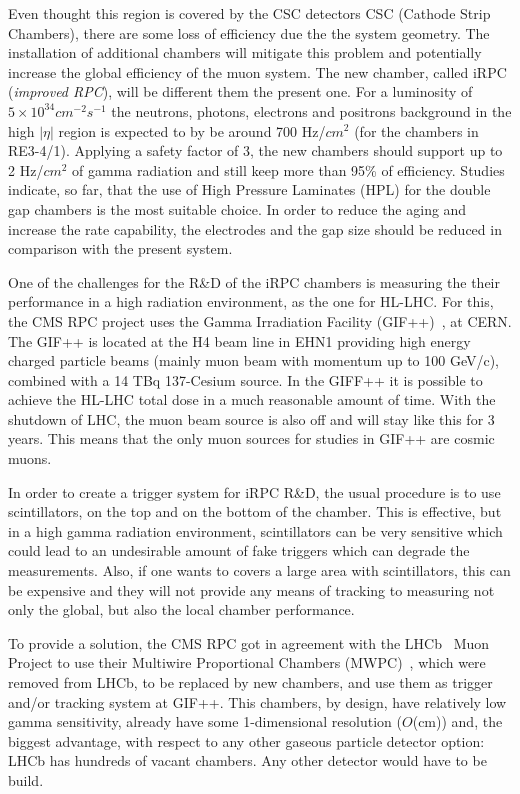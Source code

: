 Even thought this region is covered by the CSC detectors CSC (Cathode Strip Chambers), there are some loss of efficiency due the the system geometry. The installation of additional chambers will mitigate this problem and potentially increase the global efficiency of the muon system. The new chamber, called iRPC (\textit{improved RPC}), will be different them the present one. For a luminosity of $5 \times 10^{34} cm^{-2} s^{-1}$  the neutrons, photons, electrons and positrons background in the high $|\eta|$ region is expected to by be around 700 Hz/$cm^{2}$ (for the chambers in RE3-4/1). Applying a safety factor of 3, the new chambers should support up to 2 Hz/$cm^{2}$ of gamma radiation and still keep more than 95\% of efficiency. Studies indicate, so far, that the use of High Pressure Laminates (HPL) for the double gap chambers is the most suitable choice. In order to reduce the aging and increase the rate capability, the electrodes and the gap size should be reduced in comparison with the present system.

One of the challenges for the R\&D of the iRPC chambers is measuring the their performance in a high radiation environment, as the one for HL-LHC. For this, the CMS RPC project uses the Gamma Irradiation Facility (GIF++)~\cite{gifpp}, at CERN. The GIF++ is located at the H4 beam line in EHN1 providing high energy charged particle beams (mainly muon beam with momentum up to 100 GeV/c), combined with a 14 TBq 137-Cesium source. In the GIFF++ it is possible to achieve the HL-LHC total dose in a much reasonable amount of time. With the shutdown of LHC, the muon beam source is also off and will stay like this for 3 years. This means that the only muon sources for studies in GIF++ are cosmic muons. 

In order to create a trigger system for iRPC R\&D, the usual procedure is to use scintillators, on the top and on the bottom of the chamber. This is effective, but in a high gamma radiation environment, scintillators can be very sensitive which could lead to an undesirable amount of fake triggers which can degrade the measurements. Also, if one wants to covers a large area with scintillators, this can be expensive and they will not provide any means of tracking to measuring not only the global, but also the local chamber performance.

To provide a solution, the CMS RPC got in agreement with the LHCb~\cite{lhcb} Muon Project to use their Multiwire Proportional Chambers (MWPC)~\cite{mwpc}, which were removed from LHCb, to be replaced by new chambers, and use them as trigger and/or tracking system at GIF++. This chambers, by design, have relatively low gamma sensitivity, already have some 1-dimensional resolution ($O$(cm)) and, the biggest advantage, with respect to any other gaseous particle detector option: LHCb has hundreds of vacant chambers. Any other detector would have to be build.

